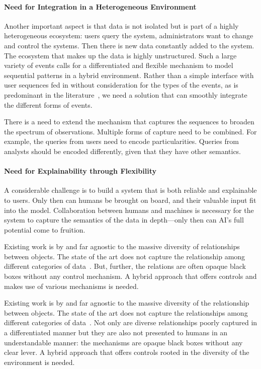 \paragraph{Need for Integration in a Heterogeneous Environment}
%
Another important aspect is that data is not isolated but is part of a highly heterogeneous ecosystem: users query the system, administrators want to change and control the systems. Then there is new data constantly added to the system. The ecosystem that makes up the data is highly unstructured. Such a large variety of events calls for a differentiated and flexible mechanism to model sequential patterns in a hybrid environment.  Rather than a simple interface with user sequences fed in without consideration for the types of the events, as is predominant in the literature~\cite{sun2019bert4rec}, we need a solution that can smoothly integrate the different forms of events.

There is a need to extend the mechanism that captures the sequences to broaden the spectrum of observations. Multiple forms of capture need to be combined. For example, the queries from users need to encode particularities. Queries from analysts should be encoded differently, given that they have other semantics. 


\paragraph{Need for Explainability through Flexibility}
%
A considerable challenge is to build a system that is both reliable and explainable to users. Only then can humans be brought on board, and their valuable input fit into the model. Collaboration between humans and machines is necessary for the system to capture the semantics of the data in depth---only then can AI's full potential come to fruition.

Existing work is by and far agnostic to the massive diversity of relationships between objects. The state of the art does not capture the relationship among different categories of data~\cite{sun2019bert4rec}. But, further, the relations are often opaque black boxes without any control mechanism. A hybrid approach that offers controls and makes use of various mechanisms is needed.

Existing work is by and far agnostic to the massive diversity of the relationship between objects. The state of the art does not capture the relationships among different categories of data~\cite{sun2019bert4rec}. Not only are diverse relationships poorly captured in a differentiated manner but they are also not presented to humans in an understandable manner: the mechanisms are opaque black boxes without any clear lever. A hybrid approach that offers controls rooted in the diversity of the environment is needed.

